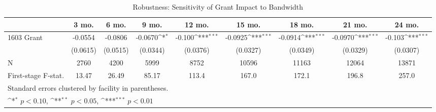 \begin{table}[htbp]\centering
\def\sym#1{\ifmmode^{#1}\else\(^{#1}\)\fi}
\caption{Robustness: Sensitivity of Grant Impact to Bandwidth\label{RDD:loggenbandwidth}}
\begin{tabular}{l*{8}{c}}
\hline\hline
                    &\multicolumn{1}{c}{3 mo.}&\multicolumn{1}{c}{6 mo.}&\multicolumn{1}{c}{9 mo.}&\multicolumn{1}{c}{12 mo.}&\multicolumn{1}{c}{15 mo.}&\multicolumn{1}{c}{18 mo.}&\multicolumn{1}{c}{21 mo.}&\multicolumn{1}{c}{24 mo.}\\
\hline
1603 Grant          &     -0.0554         &     -0.0806         &     -0.0670\sym{*}  &      -0.100\sym{***}&     -0.0925\sym{***}&     -0.0914\sym{***}&     -0.0970\sym{***}&      -0.103\sym{***}\\
                    &    (0.0615)         &    (0.0515)         &    (0.0344)         &    (0.0376)         &    (0.0327)         &    (0.0349)         &    (0.0329)         &    (0.0307)         \\
\hline
N                   &        2760         &        4200         &        5999         &        8752         &       10596         &       11163         &       12064         &       13871         \\
First-stage F-stat. &       13.47         &       26.49         &       85.17         &       113.4         &       167.0         &       172.1         &       196.8         &       257.0         \\
\hline\hline
\multicolumn{9}{l}{\footnotesize Standard errors clustered by facility in parentheses.}\\
\multicolumn{9}{l}{\footnotesize \sym{*} \(p<0.10\), \sym{**} \(p<0.05\), \sym{***} \(p<0.01\)}\\
\end{tabular}
\end{table}
